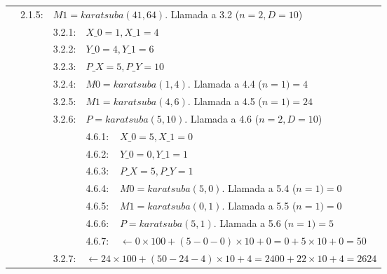\documentclass[titlepage,a4paper]{article}
\begin{document}
\begin{longtable}[r]{lllllll}
\multicolumn{2}{l}{}     & 2.1.5:     & \multicolumn{4}{l}{$M1=karatsuba(41,64)$. Llamada a 3.2 ($n=2,D=10$)}     \\
\multicolumn{3}{l}{}     & 3.2.1:     & \multicolumn{3}{l}{$X\_0=1, X\_1=4$}     \\
\multicolumn{3}{l}{}     & 3.2.2:     & \multicolumn{3}{l}{$Y\_0=4, Y\_1=6$}     \\
\multicolumn{3}{l}{}     & 3.2.3:     & \multicolumn{3}{l}{$P\_X=5, P\_Y=10$}     \\
\multicolumn{3}{l}{}     & 3.2.4:     & \multicolumn{3}{l}{$M0=karatsuba(1,4)$. Llamada a 4.4 ($n=1) = \boxed{4}$}     \\
\multicolumn{3}{l}{}     & 3.2.5:     & \multicolumn{3}{l}{$M1=karatsuba(4,6)$. Llamada a 4.5 ($n=1) = \boxed{24}$}     \\
\multicolumn{3}{l}{}     & 3.2.6:     & \multicolumn{3}{l}{$P=karatsuba(5,10)$. Llamada a 4.6 ($n=2,D=10$)}     \\
\multicolumn{4}{l}{}     & 4.6.1:     & \multicolumn{2}{l}{$X\_0=5, X\_1=0$}     \\
\multicolumn{4}{l}{}     & 4.6.2:     & \multicolumn{2}{l}{$Y\_0=0, Y\_1=1$}     \\
\multicolumn{4}{l}{}     & 4.6.3:     & \multicolumn{2}{l}{$P\_X=5, P\_Y=1$}     \\
\multicolumn{4}{l}{}     & 4.6.4:     & \multicolumn{2}{l}{$M0=karatsuba(5,0)$. Llamada a 5.4 ($n=1) = \boxed{0}$}     \\
\multicolumn{4}{l}{}     & 4.6.5:     & \multicolumn{2}{l}{$M1=karatsuba(0,1)$. Llamada a 5.5 ($n=1) = \boxed{0}$}     \\
\multicolumn{4}{l}{}     & 4.6.6:     & \multicolumn{2}{l}{$P=karatsuba(5,1)$. Llamada a 5.6 ($n=1) = \boxed{5}$}     \\
\multicolumn{4}{l}{}     & 4.6.7:     & \multicolumn{2}{l}{$\leftarrow 0\times 100 + (5-0-0)\times 10 + 0 =  0 + 5\times 10 + 0 = \boxed{50}$}     \\
\multicolumn{3}{l}{}     & 3.2.7:     & \multicolumn{3}{l}{$\leftarrow 24\times 100 + (50-24-4)\times 10 + 4 =  2400 + 22\times 10 + 4 = \boxed{2624}$}     \\


\end{longtable}
\end{document}

